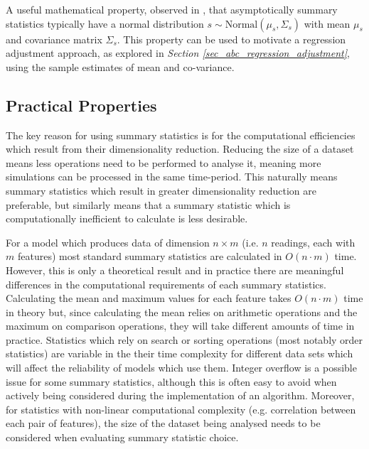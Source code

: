 \documentclass[11pt,a4paper]{article}
\theoremstyle{break}
\begin{document}
  \par A useful mathematical property, observed in \cite[]{statistical_inference_for_noisy_nonlinear_ecological_dynamic_systems}, that asymptotically summary statistics typically have a normal distribution $s\sim\text{Normal}(\mu_s,\Sigma_s)$ with mean $\mu_s$ and covariance matrix $\Sigma_s$. This property can be used to motivate a regression adjustment approach, as explored in \textit{Section \ref{sec_abc_regression_adjustment}}, using the sample estimates of mean and co-variance.

\subsection*{Practical Properties}

  \par The key reason for using summary statistics is for the computational efficiencies which result from their dimensionality reduction. Reducing the size of a dataset means less operations need to be performed to analyse it, meaning more simulations can be processed in the same time-period. This naturally means summary statistics which result in greater dimensionality reduction are preferable, but similarly means that a summary statistic which is computationally inefficient to calculate is less desirable.

  \par For a model which produces data of dimension $n\times m$ (i.e. $n$ readings, each with $m$ features) most standard summary statistics are calculated in $O(n\cdot m)$  time. However, this is only a theoretical result and in practice there are meaningful differences in the computational requirements of each summary statistics. Calculating the mean and maximum values for each feature takes $O(n\cdot m)$ time in theory but, since calculating the mean relies on arithmetic operations and the maximum on comparison operations, they will take different amounts of time in practice. Statistics which rely on search or sorting operations (most notably order statistics) are variable in the their time complexity for different data sets which will affect the reliability of models which use them. Integer overflow is a possible issue for some summary statistics, although this is often easy to avoid when actively being considered during the implementation of an algorithm. Moreover, for statistics with non-linear computational complexity (e.g. correlation between each pair of features), the size of the dataset being analysed needs to be considered when evaluating summary statistic choice.
\end{document}
